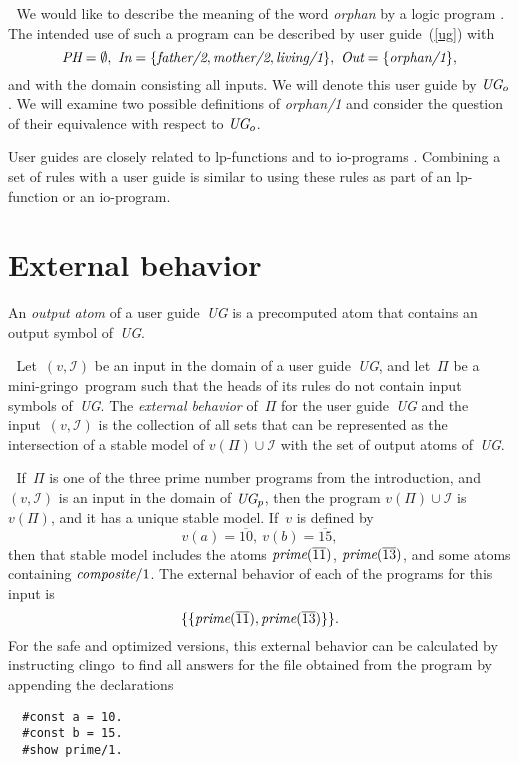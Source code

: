 \documentclass{article}
\def\gringo{{\sc gringo}}
\def\clingo{{\sc clingo}}
\def\num{\overline}
\newcommand{\I}{\mathcal{I}}
\begin{document}
\medskip{}$\;$ We would like to describe the meaning
of the word \emph{orphan} by a logic program \cite[Section ??]{gel14}.
The intended use of such a
program can be described by user guide~(\ref{ug}) with
$$\emph{PH} = \emptyset,\
\emph{In} = \{\emph{father/2},\emph{mother/2}, \emph{living/1}\},\
\emph{Out} = \{\emph{orphan/1}\},$$
and with the domain consisting all inputs.    We will denote this
user guide by $\emph{UG}_o$.  We will examine
two possible definitions of \emph{orphan/1} and consider the question of their
equivalence with respect to $\emph{UG}_o$.
\medskip

User guides are closely related to
lp-functions \cite[Section~2]{gel02}
    and to io-programs \cite[Section~5]{fan20}.
    Combining a set of rules with a user guide is similar to using these
    rules as part of
    an lp-function or an io-program.

\section{External behavior}

    An \emph{output atom} of a user guide~\emph{UG} is a precomputed atom
    that contains an output symbol of~\emph{UG}.
    
    \medskip{}$\;$
    Let~$(v,\I)$ be an input in the domain
    of a user guide~\emph{UG}, and let~$\Pi$ be
a mini-\gringo\ program such that the heads of its rules do not
contain input symbols of~\emph{UG}.  The \emph{external behavior} of~$\Pi$
for the user guide~\emph{UG} and the input~$(v,\I)$ is the collection
of all sets that can be represented as the intersection of a stable model
of $v(\Pi)\cup\I$ with the set of output atoms of~\emph{UG}.

\medskip{}$\;$ If~$\Pi$ is one of the
three prime number programs from the introduction, and $(v,\I)$ is an
input in the domain of $\emph{UG}_p$, then the program $v(\Pi)\cup\I$
is $v(\Pi)$, and it has a unique stable model.  If~$v$ is defined by
$$v(a)=\num{10},\ v(b)=\num{15},$$
then that stable model includes the atoms $\emph{prime}(\num{11})$,
$\emph{prime}(\num{13})$, and some atoms containing
$\emph{composite}/1$.  The external behavior of each of the programs
for this input is
$$\{\{\emph{prime}(\num{11}),\emph{prime}(\num{13})\}\}.$$
For the safe and optimized versions, this external behavior
can be calculated by instructing \clingo\ to
find all answers for the file obtained from the program by appending the
declarations
\begin{verbatim}
  #const a = 10.
  #const b = 15.
  #show prime/1.
\end{verbatim}
\end{document}
